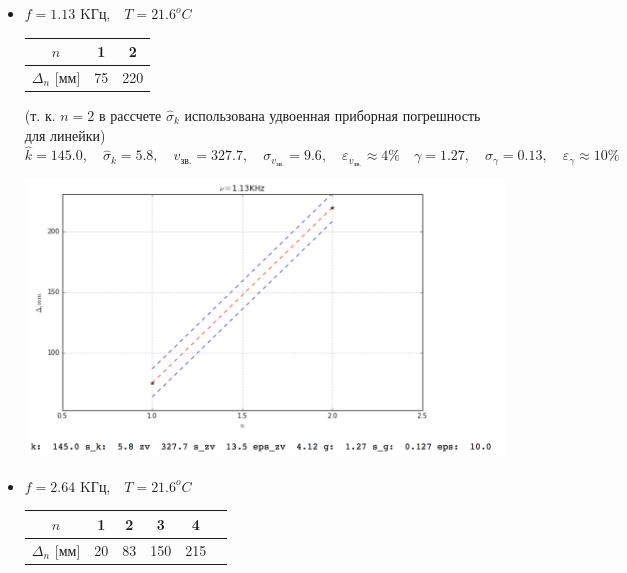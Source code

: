 \documentclass[10pt]{article}
\begin{document}
\begin{enumerate}
    \begin{itemize}
        \item $f = 1.13$ KГц,$ \quad T = 21.6^o C$

        \begin{center}
                    \begin{tabular}{|c|c|c|}
                            \hline 
                                $n$ & 1 & 2 \\
                            \hline
                                $\Delta_n$ [мм]& 75&220\\
                            \hline
                    \end{tabular}
        \end{center}

        (т. к. $n = 2$ в рассчете $\hat{\sigma}_k$ использована удвоенная приборная погрешность для линейки)
        \begin{equation}
            \hat{k} = 145.0 , \quad \hat{\sigma}_k = 5.8, \quad v_\text{зв.} = 327.7, \quad \sigma_{v_\text{зв.}} = 9.6 , \quad \varepsilon_{v_\text{зв.}}  \approx 4\% \quad \gamma = 1.27, \quad \sigma_\gamma = 0.13, \quad \varepsilon_\gamma \approx 10\%
        \end{equation}

        \begin{center} 
            \includegraphics[width=5in]{1ex.png}
        \end{center}

        \item $f = 2.64$ KГц,$ \quad T = 21.6^o C$

        \begin{center}
                    \begin{tabular}{|c|c|c|c|c|c|}
                            \hline 
                                $n$ & 1 & 2 & 3 & 4  \\
                            \hline
                                $\Delta_n$ [мм]& 20&83&150&215\\
                            \hline
                    \end{tabular}
        \end{center}


\end{itemize}
\end{enumerate}
\end{document}
